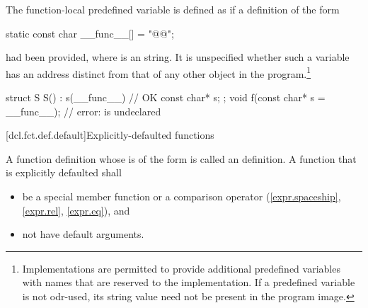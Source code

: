 \pnum
The function-local predefined variable  is
defined as if a definition of the form
\begin{codeblock}
static const char __func__[] = "@@";
\end{codeblock}
had been provided, where  is an  string.
It is unspecified whether such a variable has an address
distinct from that of any other object in the program.\footnote{Implementations are
permitted to provide additional predefined variables with names that are reserved to the
implementation. If a predefined variable is not
odr-used, its string value need not be present in the program image.}
\begin{example}
\begin{codeblock}
struct S {
  S() : s(__func__) { }             // OK
  const char* s;
};
void f(const char* s = __func__);   // error:  is undeclared
\end{codeblock}
\end{example}

[dcl.fct.def.default]{Explicitly-defaulted functions}%

\pnum
A function definition whose
is of the form
is called an  definition.
A function that is explicitly defaulted shall

\begin{itemize}
\item be a special member function or a comparison operator
(\ref{expr.spaceship}, \ref{expr.rel}, \ref{expr.eq}), and

\item not have default arguments.
\end{itemize}

